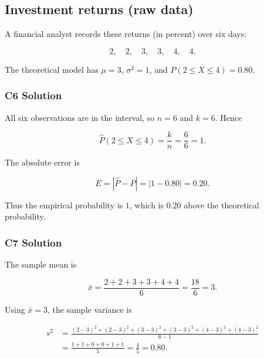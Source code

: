 \subsection{Investment returns (raw data)}
\label{sec:c6c7-data-raw}

A financial analyst records these returns (in percent) over six days:

\[
2,\quad 2,\quad 3,\quad 3,\quad 4,\quad 4.
\]

The theoretical model has $\mu=3$, $\sigma^2=1$, and
$P(2\leq X\leq4)=0.80$.


\subsubsection*{C6 Solution}
\label{subsec:c6-probability-raw-b}

All six observations are in the interval, so $n=6$ and $k=6$. Hence

\[
\widehat P(2\leq X\leq4)=\frac{k}{n}=\frac{6}{6}=1.
\]

The absolute error is

\[
E=|\widehat P-P|=|1-0.80|=0.20.
\]

Thus the empirical probability is $1$, which is $0.20$ above the
theoretical probability.


\subsubsection*{C7 Solution}
\label{subsec:c7-meanvar-raw-b}

The sample mean is

\[
\bar{x}
=\frac{2+2+3+3+4+4}{6}
=\frac{18}{6}
=3.
\]

Using $\bar{x}=3$, the sample variance is

\[
\begin{aligned}
s^2
&=\frac{(2-3)^2+(2-3)^2+(3-3)^2+(3-3)^2+(4-3)^2+(4-3)^2}{6-1}\\
&=\frac{1+1+0+0+1+1}{5}
=\frac45
=0.80.
\end{aligned}
\]

